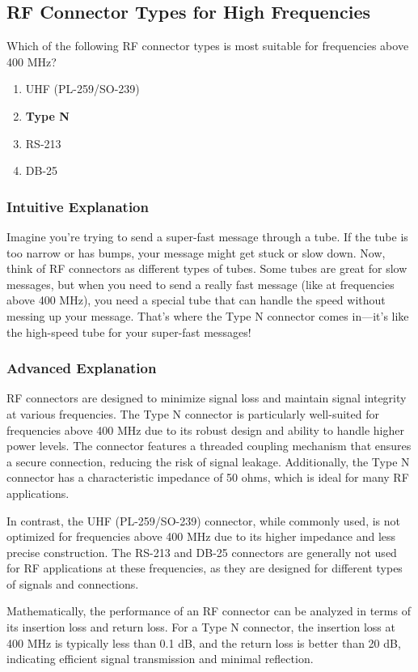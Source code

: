 \subsection{RF Connector Types for High Frequencies}
\label{T9B06}

\begin{tcolorbox}[colback=gray!10!white,colframe=black!75!black,title=T9B06]
Which of the following RF connector types is most suitable for frequencies above 400 MHz?
\begin{enumerate}[label=\Alph*)]
    \item UHF (PL-259/SO-239)
    \item \textbf{Type N}
    \item RS-213
    \item DB-25
\end{enumerate}
\end{tcolorbox}

\subsubsection*{Intuitive Explanation}
Imagine you're trying to send a super-fast message through a tube. If the tube is too narrow or has bumps, your message might get stuck or slow down. Now, think of RF connectors as different types of tubes. Some tubes are great for slow messages, but when you need to send a really fast message (like at frequencies above 400 MHz), you need a special tube that can handle the speed without messing up your message. That's where the Type N connector comes in—it's like the high-speed tube for your super-fast messages!

\subsubsection*{Advanced Explanation}
RF connectors are designed to minimize signal loss and maintain signal integrity at various frequencies. The Type N connector is particularly well-suited for frequencies above 400 MHz due to its robust design and ability to handle higher power levels. The connector features a threaded coupling mechanism that ensures a secure connection, reducing the risk of signal leakage. Additionally, the Type N connector has a characteristic impedance of 50 ohms, which is ideal for many RF applications.

In contrast, the UHF (PL-259/SO-239) connector, while commonly used, is not optimized for frequencies above 400 MHz due to its higher impedance and less precise construction. The RS-213 and DB-25 connectors are generally not used for RF applications at these frequencies, as they are designed for different types of signals and connections.

Mathematically, the performance of an RF connector can be analyzed in terms of its insertion loss and return loss. For a Type N connector, the insertion loss at 400 MHz is typically less than 0.1 dB, and the return loss is better than 20 dB, indicating efficient signal transmission and minimal reflection.

